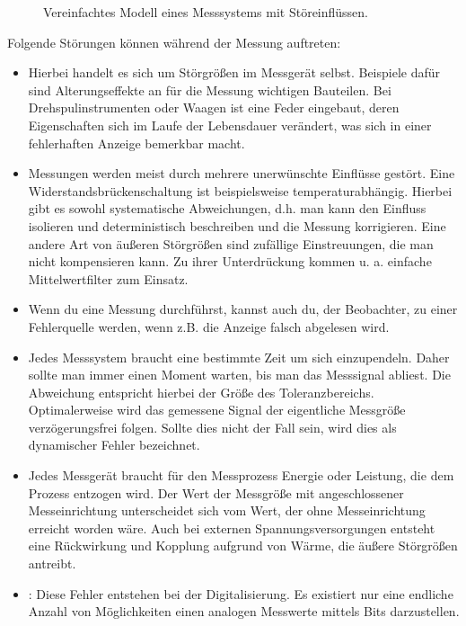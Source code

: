 \documentclass[letterpaper,10pt,english]{jupyterBook}
\let\sphinxpxdimen\pdfpxdimen\else\newdimen\sphinxpxdimen
\begin{document}
\begin{figure}[htbp]
\centering
\capstart

\noindent\sphinxincludegraphics[width=600\sphinxpxdimen]{{fehlerklassen}.jpg}
\caption{Vereinfachtes Modell eines Messsystems mit Störeinflüssen.}\label{\detokenize{content/1_Messunsicherheiten:fehlerklassen}}\end{figure}

\sphinxAtStartPar
Folgende Störungen können während der Messung auftreten:
\begin{itemize}
\item {} 
\sphinxAtStartPar
{} Hierbei handelt es sich um Störgrößen im Messgerät selbst. Beispiele dafür sind Alterungseffekte an für die Messung wichtigen Bauteilen. Bei Drehspulinstrumenten oder Waagen ist eine Feder eingebaut, deren Eigenschaften sich im Laufe der Lebensdauer verändert, was sich in einer fehlerhaften Anzeige bemerkbar macht.

\item {} 
\sphinxAtStartPar
{} Messungen werden meist durch mehrere unerwünschte Einflüsse gestört. Eine Widerstandsbrückenschaltung ist beispielsweise temperaturabhängig. Hierbei gibt es sowohl systematische Abweichungen, d.h. man kann den Einfluss isolieren und deterministisch beschreiben und die Messung korrigieren. Eine andere Art von äußeren Störgrößen sind zufällige Einstreuungen, die man nicht kompensieren kann. Zu ihrer Unterdrückung kommen u. a. einfache Mittelwertfilter zum Einsatz.

\item {} 
\sphinxAtStartPar
{} Wenn du eine Messung durchführst, kannst auch du, der Beobachter, zu einer Fehlerquelle werden, wenn z.B. die Anzeige falsch abgelesen wird.

\item {} 
\sphinxAtStartPar
{} Jedes Messsystem braucht eine bestimmte Zeit um sich einzupendeln. Daher sollte man immer einen Moment warten, bis man das Messsignal abliest. Die Abweichung entspricht hierbei der Größe des Toleranzbereichs. Optimalerweise wird das gemessene Signal der eigentliche Messgröße verzögerungsfrei folgen. Sollte dies nicht der Fall sein, wird dies als dynamischer Fehler bezeichnet.

\item {} 
\sphinxAtStartPar
{} Jedes Messgerät braucht für den Messprozess Energie oder Leistung, die dem Prozess entzogen wird. Der Wert der Messgröße mit angeschlossener Messeinrichtung unterscheidet sich vom Wert, der ohne Messeinrichtung erreicht worden wäre. Auch bei externen Spannungsversorgungen entsteht eine Rückwirkung und Kopplung aufgrund von Wärme, die äußere Störgrößen antreibt.

\item {} 
\sphinxAtStartPar
{}: Diese Fehler entstehen bei der Digitalisierung. Es existiert nur eine endliche Anzahl von Möglichkeiten einen analogen Messwerte mittels Bits darzustellen.

\end{itemize}
\end{document}
